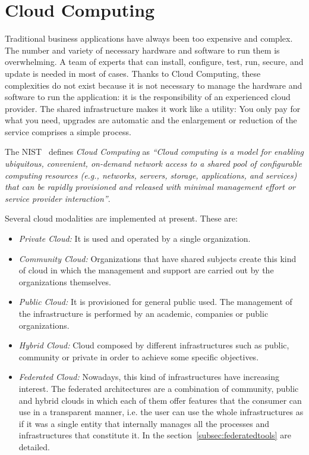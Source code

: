 \section{Cloud Computing}

Traditional business applications have always been too expensive and complex. The number and variety of necessary hardware and software to run them
is overwhelming. A team of experts that can install, configure, test, run,
secure, and update is needed in most of cases.
Thanks to Cloud Computing, these
complexities do not exist because it is not necessary to manage the hardware
and software to run the application: it is the responsibility of an experienced cloud provider. The
shared infrastructure makes it work like a utility: You only pay for what you
need, upgrades are automatic and the enlargement or reduction of the service
comprises a simple process.

The NIST~\cite{Mell2011} defines \emph{Cloud Computing} as \emph{``Cloud computing is a model for enabling ubiquitous, convenient, on-demand network access to a shared
pool of configurable computing resources (e.g., networks, servers, storage, applications, and services) that
can be rapidly provisioned and released with minimal management effort or
service provider interaction''}.

Several cloud modalities are implemented at present. These are:
\begin{itemize}
\item \emph{Private Cloud:} It is used and operated by a single organization.
\item \emph{Community Cloud:} Organizations that have shared subjects create
  this kind of cloud in which the management and support are carried out by the
  organizations themselves.
\item \emph{Public Cloud:} It is provisioned for  general public used. The
  management of the infrastructure is performed by an academic, companies or
  public organizations.
\item \emph{Hybrid Cloud:} Cloud composed by different infrastructures such as
  public,   community or private in order to achieve some specific objectives.
\item \emph{Federated Cloud:} Nowadays, this kind of infrastructures have
  increasing interest. The federated architectures are a combination of community, public
  and hybrid clouds in which each of them offer features that the consumer can
  use in a transparent manner, i.e. the user can use the whole infrastructures
  as if it was a single entity that internally manages all the processes and
  infrastructures that constitute it. In the section~\ref{subsec:federatedtools} are detailed.
\end{itemize}

